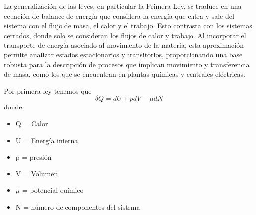 
\begin{center}
 La generalización de las leyes, en particular la Primera Ley, se traduce en una ecuación de balance de energía que considera la energía que entra y sale del sistema con el flujo de masa, el calor y el trabajo. Esto contrasta con los sistemas cerrados, donde solo se consideran los flujos de calor y trabajo. Al incorporar el transporte de energía asociado al movimiento de la materia, esta aproximación permite analizar estados estacionarios y transitorios, proporcionando una base robusta para la descripción de procesos que implican movimiento y transferencia de masa, como los que se encuentran en plantas químicas y centrales eléctricas.
\end{center}
Por primera ley tenemos que 
\begin{equation}
    \delta  Q=dU+pdV-\mu dN \tag{3.1}
\end{equation}
donde:
\begin{multicols}{2}

\begin{itemize}
    \item Q = Calor
    \item U = Energía interna
    \item p = presión
    \item V = Volumen
    \item $\mu$ = potencial químico
    \item N = número de componentes del sistema
\end{itemize}
    
\end{multicols}

